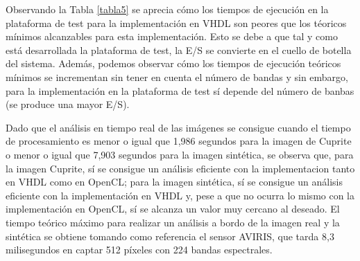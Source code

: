 Observando la Tabla \ref{tabla5} se aprecia cómo los tiempos de ejecución en la plataforma de test para la implementación en VHDL son peores que los téoricos mínimos alcanzables para esta implementación. Esto se debe a que tal y como está desarrollada la plataforma de test, la E/S se convierte en el cuello de botella del sistema. Además, podemos observar cómo los tiempos de ejecución teóricos mínimos se incrementan sin tener en cuenta el número de bandas y sin embargo, para la implementación en la plataforma de test sí depende del número de banbas (se produce una mayor E/S). 


Dado que el análisis en tiempo real de las imágenes se consigue cuando el tiempo de procesamiento es menor o igual que 1,986 segundos para la imagen de Cuprite o menor o igual que 7,903 segundos para la imagen sintética, se observa que, para la imagen Cuprite, sí se consigue un análisis eficiente con la implementacion tanto en VHDL como en OpenCL; para la imagen sintética, sí se consigue un análisis eficiente con la implementación en VHDL y, pese a que no ocurra lo mismo con la implementación en OpenCL, sí se alcanza un valor muy cercano al deseado. El tiempo teórico máximo para realizar un análisis a bordo de la imagen real y la sintética se obtiene tomando como referencia el sensor AVIRIS, que tarda 8,3 milisegundos en captar 512 píxeles con 224 bandas espectrales.

